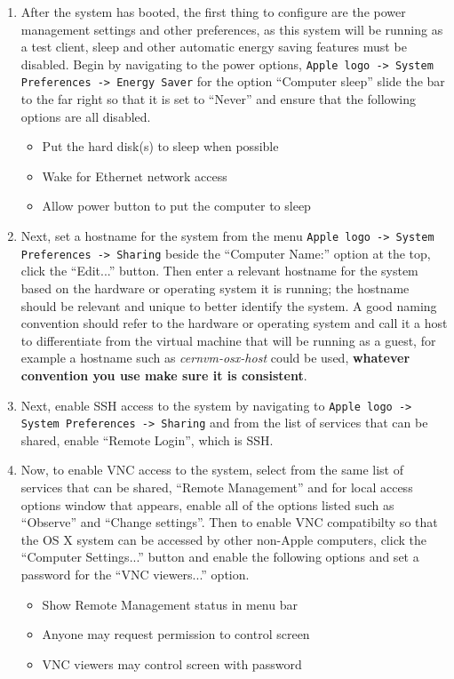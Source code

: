 \begin{enumerate}
\item	After the system has booted, the first thing to configure are the power management settings and other preferences, as this system
		will be running as a test client, sleep and other automatic energy saving features must be disabled. Begin by navigating to the
		power options, \verb|Apple logo -> System Preferences -> Energy Saver| for the option ``Computer sleep'' slide the bar to the
		far right so that it is set to ``Never'' and ensure that the following options are all disabled.
\begin{itemize}
\item	Put the hard disk(s) to sleep when possible

\item	Wake for Ethernet network access

\item 	Allow power button to put the computer to sleep
\end{itemize}

\item	Next, set a hostname for the system from the menu \verb|Apple logo -> System Preferences -> Sharing| beside the ``Computer Name:''
		option at the top, click the ``Edit...'' button. Then enter a relevant hostname for the system based on the hardware or operating
		system it is running; the hostname should be relevant and unique to better identify the system. A good naming convention should 
		refer to the hardware or operating system and call it a host to differentiate from the virtual machine that will be running as 
		a guest, for example a hostname such as \emph{cernvm-osx-host} could be used, {\bf whatever convention you use make sure it is 
		consistent}.

\item	Next, enable SSH access to the system by navigating to \verb|Apple logo -> System Preferences -> Sharing| and from the list of 
		services that can be shared, enable ``Remote Login'', which is SSH.
		
\item	Now, to enable VNC access to the system, select from the same list of services that can be shared, ``Remote Management'' and
		for local access options window that appears, enable all of the options listed such as ``Observe'' and ``Change settings''.
		Then to enable VNC compatibilty so that the OS X system can be accessed by other non-Apple computers, click the ``Computer
		Settings...'' button and enable the following options and set a password for the ``VNC viewers...'' option.
\begin{itemize}
\item	Show Remote Management status in menu bar
\item	Anyone may request permission to control screen
\item	VNC viewers may control screen with password
\end{itemize}


\end{enumerate}
